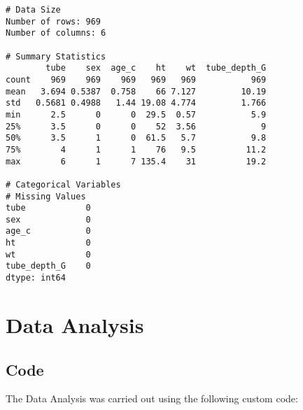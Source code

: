 \documentclass[11pt]{article}
\begin{document}
\begin{Verbatim}[tabsize=4]
# Data Size
Number of rows: 969
Number of columns: 6

# Summary Statistics
        tube    sex  age_c    ht    wt  tube_depth_G
count    969    969    969   969   969           969
mean   3.694 0.5387  0.758    66 7.127         10.19
std   0.5681 0.4988   1.44 19.08 4.774         1.766
min      2.5      0      0  29.5  0.57           5.9
25%      3.5      0      0    52  3.56             9
50%      3.5      1      0  61.5   5.7           9.8
75%        4      1      1    76   9.5          11.2
max        6      1      7 135.4    31          19.2

# Categorical Variables
# Missing Values
tube            0
sex             0
age_c           0
ht              0
wt              0
tube_depth_G    0
dtype: int64

\end{Verbatim}

\section{Data Analysis}
\subsection{{Code}}
The Data Analysis was carried out using the following custom code:
\end{document}
